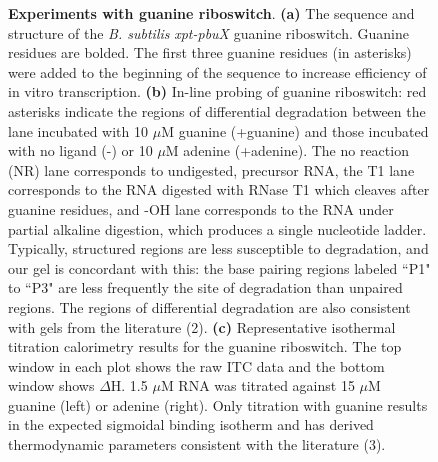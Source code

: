 \documentclass[12pt]{report}
\begin{document}
\begin{figure}[h]
	\caption[Experiments with guanine riboswitch]{\textbf{Experiments with guanine riboswitch}. \textbf{(a)} The sequence and structure of the \textit{B. subtilis} \textit{xpt-pbuX} guanine riboswitch. Guanine residues are bolded. The first three guanine residues (in asterisks) were added to the beginning of the sequence to increase efficiency of in vitro transcription. \textbf{(b)} In-line probing of guanine riboswitch: red asterisks indicate the regions of differential degradation between the lane incubated with 10 $\mu$M guanine (+guanine) and those incubated with no ligand (-) or 10 $\mu$M adenine (+adenine). The no reaction (NR) lane corresponds to undigested, precursor RNA, the T1 lane corresponds to the RNA digested with RNase T1 which cleaves after guanine residues, and -OH lane corresponds to the RNA under partial alkaline digestion, which produces a single nucleotide ladder. Typically, structured regions are less susceptible to degradation, and our gel is concordant with this: the base pairing regions labeled ``P1" to ``P3" are less frequently the site of degradation than unpaired regions. The regions of differential degradation are also consistent with gels from the literature (2). \textbf{(c)} Representative isothermal titration calorimetry results for the guanine riboswitch. The top window in each plot shows the raw ITC data and the bottom window shows $\Delta$H. 1.5 $\mu$M RNA was titrated against 15 $\mu$M guanine (left) or adenine (right). Only titration with guanine results in the expected sigmoidal binding isotherm and has derived thermodynamic parameters consistent with the literature (3).}
	\label{fig:S2}
\end{figure}

\newpage
\end{document}
